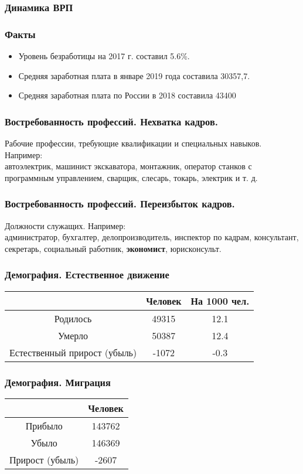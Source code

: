 \begin{frame}
\frametitle{Динамика ВРП}
\end{frame}

\begin{frame}
\frametitle{Факты}
\begin{itemize}
	\item Уровень безработицы на 2017 г. составил 5.6\%.
	\item Средняя заработная плата в январе 2019 года составила 30357,7.
	\item Средняя заработная плата по России в 2018 составила 43400
\end{itemize}
\end{frame}

\begin{frame}
\frametitle{Востребованность профессий. Нехватка кадров.}
Рабочие профессии, требующие квалификации и специальных навыков. Например:\\ автоэлектрик, машинист экскаватора, монтажник, оператор станков с программным управлением, сварщик, слесарь, токарь, электрик и т. д.
\end{frame}

\begin{frame}
\frametitle{Востребованность профессий. Переизбыток кадров.}
Должности служащих. Например:\\
администратор, бухгалтер, делопроизводитель, инспектор по кадрам, консультант, секретарь, социальный работник, \textbf{экономист}, юрисконсульт.
\end{frame}

\begin{frame}
\frametitle{Демография. Естественное движение}
\begin{center}
\begin{tabular}{|c|c|c|}
	\hline
	& Человек & На 1000 чел. \\
	\hline
	Родилось & 49315 & 12.1 \\
	\hline
	Умерло &  50387 & 12.4 \\
	\hline
	Естественный прирост (убыль) & -1072 & -0.3\\
	\hline
\end{tabular}
\end{center}
\end{frame}

\begin{frame}
\frametitle{Демография. Миграция}
\begin{center}
\begin{tabular}{|c|c|}
	\hline
	& Человек  \\
	\hline
	Прибыло &  143762 \\
	\hline
	Убыло &  146369 \\
	\hline
	Прирост (убыль) & -2607 \\
	\hline
\end{tabular}
\end{center}
\end{frame}